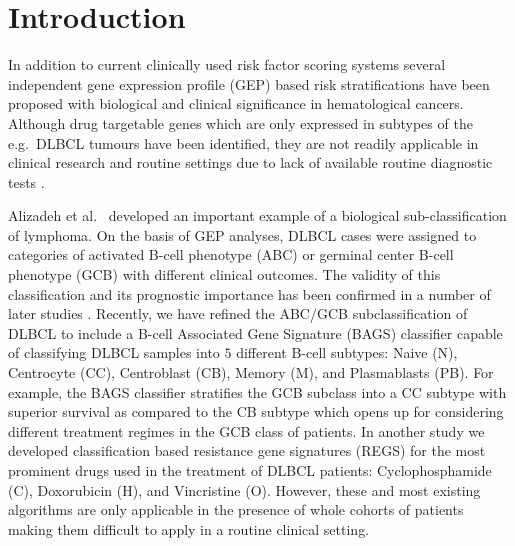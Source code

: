 \documentclass[twocolumn]{bmcart}%
\begin{document}




\section{Introduction}
In addition to current clinically used risk factor scoring systems several independent gene expression profile (GEP) based risk stratifications have been proposed with biological and clinical significance in hematological cancers.
Although drug targetable genes which are only expressed in subtypes of the e.g.\ DLBCL tumours have been identified, they are not readily applicable in clinical research and routine settings due to lack of available routine diagnostic tests \cite{Jaffe2009, Sehn2014}.

Alizadeh et al.~\cite{Alizadeh2000} developed an important example of a biological sub-classification of lymphoma.
On the basis of GEP analyses, DLBCL cases were assigned to categories of activated B-cell phenotype (ABC) or germinal center B-cell phenotype (GCB) with different clinical outcomes.
The validity of this classification and its prognostic importance has been confirmed in a number of later studies \cite{Rosenwald2002a,Hans2004,Poulsen2005,Lenz2008a,Monti2012a}.
Recently, we have refined the ABC/GCB subclassification of DLBCL to include a B-cell Associated Gene Signature (BAGS) classifier \cite{DybkaerBoegsted2015} capable of classifying DLBCL samples into $5$ different B-cell subtypes:
Naive (N), Centrocyte (CC), Centroblast (CB), Memory (M), and Plasmablasts (PB).
For example, the BAGS classifier stratifies the GCB subclass into a CC subtype with superior survival as compared to the CB subtype \cite{DybkaerBoegsted2015} which opens up for considering different treatment regimes in the GCB class of patients.
In another study \cite{Falgreen2015} we developed classification based resistance gene signatures (REGS) for the most prominent drugs used in the treatment of DLBCL patients:
Cyclophosphamide (C), Doxorubicin (H), and Vincristine (O).
However, these and most existing algorithms are only applicable in the presence of whole cohorts of patients making them difficult to apply in a routine clinical setting.
\end{document}
